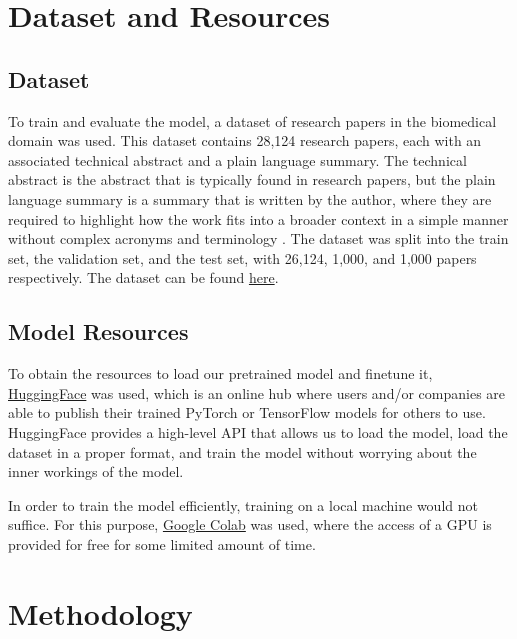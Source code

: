 \documentclass[11pt,a4paper]{article}
\begin{document}
\section{Dataset and Resources}
\subsection{Dataset}
\indent \indent To train and evaluate the model, a dataset of research papers in the biomedical domain was used. This dataset contains 28,124 research papers, each with an associated technical abstract and a plain language summary. The technical abstract is the abstract that is typically found in research papers, but the plain language summary is a summary that is written by the author, where they are required to highlight how the work fits into a broader context in a simple manner without complex acronyms and terminology \cite{luo2022readability}. The dataset was split into the train set, the validation set, and the test set, with 26,124, 1,000, and 1,000 papers respectively. The dataset can be found \href{https://www.dropbox.com/s/huwm01glsk9fou0/plos_readability_ctrl_sum_corpus.rar?dl=0}{here}.

\subsection{Model Resources}

\indent \indent To obtain the resources to load our pretrained model and finetune it, \href{https://huggingface.co/}{HuggingFace} was used, which is an online hub where users and/or companies are able to publish their trained PyTorch or TensorFlow models for others to use. HuggingFace provides a high-level API that allows us to load the model, load the dataset in a proper format, and train the model without worrying about the inner workings of the model.

In order to train the model efficiently, training on a local machine would not suffice. For this purpose, \href{colab.research.google.com}{Google Colab} was used, where the access of a GPU is provided for free for some limited amount of time.

\section{Methodology}
\end{document}
